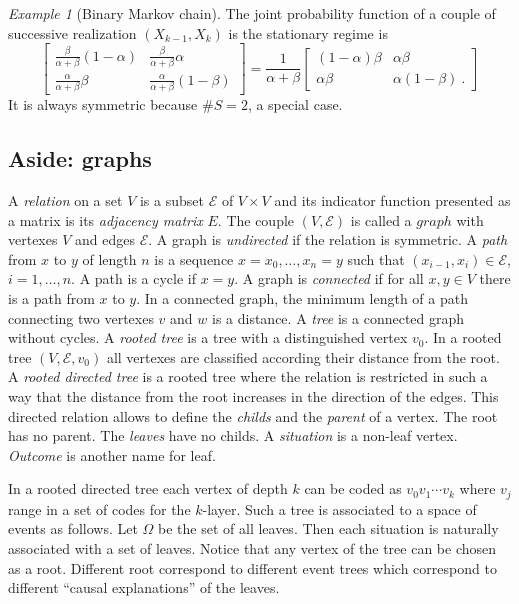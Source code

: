 \documentclass[12pt,a4paper]{amsart}
\theoremstyle{plain}%
\theoremstyle{definition}
\theoremstyle{remark}
\newtheorem{example}{Example}
\begin{document}
\begin{example}[Binary Markov chain]
The joint probability function of a couple of successive realization $(X_{k-1},X_k)$ is the stationary regime is 
\begin{equation*}\begin{bmatrix}
  \frac{\beta}{\alpha+\beta} (1-\alpha)& \frac{\beta}{\alpha+\beta} \alpha\\  \frac{\alpha}{\alpha+\beta}\beta &   \frac{\alpha}{\alpha+\beta}(1-\beta)
\end{bmatrix} = \frac1{\alpha+\beta}\begin{bmatrix}
  (1-\alpha)\beta & \alpha\beta \\ \alpha\beta & \alpha(1-\beta) \ .
\end{bmatrix}
\end{equation*}
It is always symmetric because $\#S =2$, a special case.
\end{example}

\subsection{Aside: graphs}
A \emph{relation} on a set $V$ is a subset $\mathcal E$ of $V \times V$ and its indicator function presented as a matrix is its \emph{adjacency matrix} $E$. The couple $(V,\mathcal E)$ is called a $graph$ with vertexes $V$ and edges $\mathcal E$. A graph is \emph{undirected} if the relation is symmetric. A \emph{path} from $x$ to $y$ of length $n$ is a sequence $x = x_0,\dots,x_n=y$ such that $(x_{i-1},x_i) \in \mathcal E$, $i =1,\dots,n$. A path is a cycle if $x=y$. A graph is \emph{connected} if for all $x,y \in V$ there is a path from $x$ to $y$. In a connected graph, the minimum length of a path connecting two vertexes $v$ and $w$ is a distance. A \emph{tree} is a connected graph without cycles. A \emph{rooted tree} is a tree with a distinguished vertex $v_0$. In a rooted tree $(V,\mathcal E,v_0)$ all vertexes are classified according their distance from the root. A \emph{rooted directed tree} is a rooted tree where the relation is restricted in such a way that the distance from the root increases in the direction of the edges. This directed relation allows to define the \emph{childs} and the \emph{parent} of a vertex. The root has no parent. The \emph{leaves} have no childs. A \emph{situation} is a non-leaf vertex. \emph{Outcome} is another name for leaf.

In a rooted directed tree each vertex of depth $k$ can be coded as $v_0v_1\cdots v_k$ where $v_j$ range in a set of codes for the $k$-layer. Such a tree is associated to a space of events as follows. Let $\Omega$ be the set of all leaves. Then each situation is naturally associated with a set of leaves. Notice that any vertex of the tree can be chosen as a root. Different root correspond to different event trees which correspond to different ``causal explanations'' of the leaves.
\end{document}
